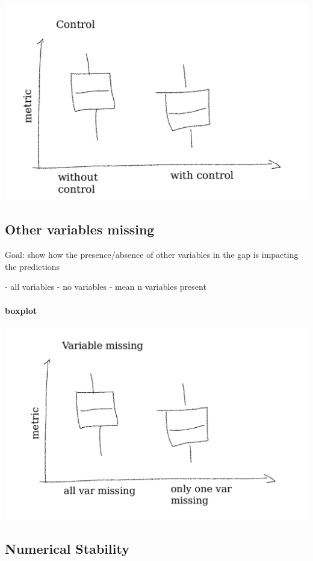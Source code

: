 \documentclass{article}
\let\Oldsubsection\subsection
\renewcommand{\subsection}{\FloatBarrier\Oldsubsection}
\begin{document}
\includegraphics[width=\textwidth]{example_control}


\subsection{Other variables missing}

Goal: show how the presence/absence of other variables in the gap is impacting the predictions

- all variables
- no variables
- mean n variables present

\paragraph{boxplot}

\includegraphics[width=\textwidth]{example_var_missing}




\subsection{Numerical Stability}
\end{document}
